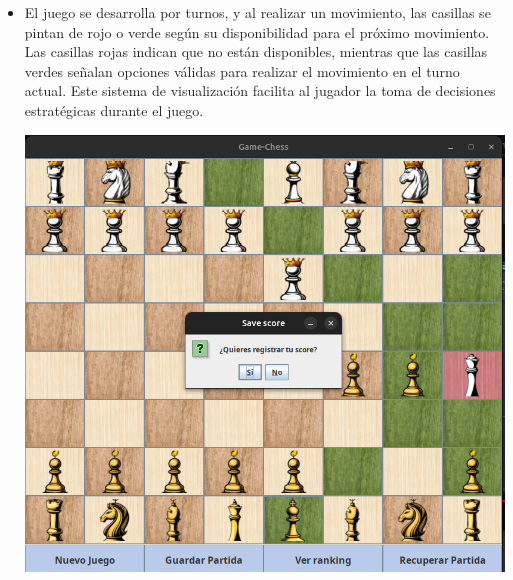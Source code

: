 \documentclass{article}
\begin{document}
\begin{itemize}
\item El juego se desarrolla por turnos, y al realizar un movimiento, las casillas se pintan de rojo o verde según su disponibilidad para el próximo movimiento. Las casillas rojas indican que no están disponibles, mientras que las casillas verdes señalan opciones válidas para realizar el movimiento en el turno actual. Este sistema de visualización facilita al jugador la toma de decisiones estratégicas durante el juego.
\begin{center}
    \includegraphics[width=16cm]{latex/img/4.png}
\end{center}




\end{itemize}
\end{document}
